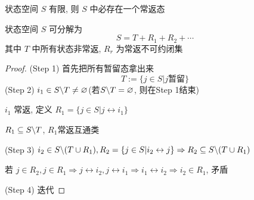 \begin{corollary}
    状态空间 $S$ 有限, 则 $S$ 中必存在一个常返态
\end{corollary}

\begin{theorem}[分解定理]
    状态空间 $S$ 可分解为
    \[
    S=T+R_1+R_2+\cdots
    \]
    其中 $T$ 中所有状态非常返, $R_r$ 为常返不可约闭集
\end{theorem}
\begin{proof}
(Step 1) 首先把所有暂留态拿出来
\[
T:=\{j\in S|j\text{暂留}\}
\]
(Step 2) $i_1\in S\backslash T\neq \varnothing$(若$S\backslash T=\varnothing$, 则在Step 1结束)

$i_1$ 常返, 定义 $R_1=\{j\in S|j\leftrightarrow i_1\}$

$R_1\subseteq S\backslash T$, $R_1$常返互通类

(Step 3) $i_2\in S\backslash (T\cup R_1),R_2=\{j\in S|i_2\leftrightarrow j\}\Rightarrow R_2\subseteq S\backslash (T\cup R_1)$

若 $j\in R_2,j\in R_1\Rightarrow j\leftrightarrow i_2,j\leftrightarrow i_1\Rightarrow i_1\leftrightarrow i_2\Rightarrow i_2\in R_1$, 矛盾

(Step 4) 迭代
\end{proof}
\newpage